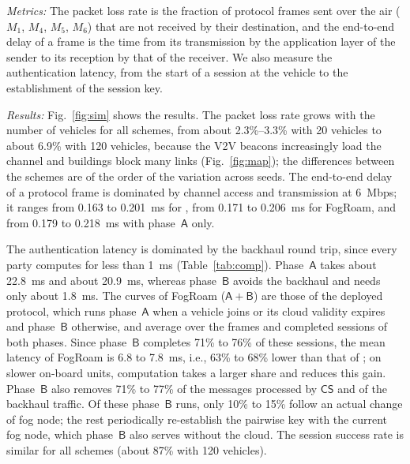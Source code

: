 \documentclass[journal]{IEEEtran}
\theoremstyle{plain}
\theoremstyle{definition}
\newcommand{\CS}{\mathsf{CS}}            %
\newcommand{\protocol}{\textsf{FogRoam}}   %
\begin{document}
\emph{Metrics:} The packet loss rate is the fraction of protocol frames sent over the air ($M_1$, $M_4$, $M_5$, $M_6$) that are not received by their destination, and the end-to-end delay of a frame is the time from its transmission by the application layer of the sender to its reception by that of the receiver. We also measure the authentication latency, from the start of a session at the vehicle to the establishment of the session key.

\emph{Results:} Fig.~\ref{fig:sim} shows the results. The packet loss rate grows with the number of vehicles for all schemes, from about 2.3\%--3.3\% with 20 vehicles to about 6.9\% with 120 vehicles, because the V2V beacons increasingly load the channel and buildings block many links (Fig.~\ref{fig:map}); the differences between the schemes are of the order of the variation across seeds. The end-to-end delay of a protocol frame is dominated by channel access and transmission at 6~Mbps; it ranges from 0.163 to 0.201~ms for \cite{chen2024provably}, from 0.171 to 0.206~ms for {\protocol}, and from 0.179 to 0.218~ms with phase~$\mathsf{A}$ only.

The authentication latency is dominated by the backhaul round trip, since every party computes for less than 1~ms (Table~\ref{tab:comp}). Phase~$\mathsf{A}$ takes about 22.8~ms and \cite{chen2024provably} about 20.9~ms, whereas phase~$\mathsf{B}$ avoids the backhaul and needs only about 1.8~ms. The curves of {\protocol} ($\mathsf{A}{+}\mathsf{B}$) are those of the deployed protocol, which runs phase~$\mathsf{A}$ when a vehicle joins or its cloud validity expires and phase~$\mathsf{B}$ otherwise, and average over the frames and completed sessions of both phases. Since phase~$\mathsf{B}$ completes 71\% to 76\% of these sessions, the mean latency of {\protocol} is 6.8 to 7.8~ms, i.e., 63\% to 68\% lower than that of \cite{chen2024provably}; on slower on-board units, computation takes a larger share and reduces this gain. Phase~$\mathsf{B}$ also removes 71\% to 77\% of the messages processed by $\CS$ and of the backhaul traffic. Of these phase~$\mathsf{B}$ runs, only 10\% to 15\% follow an actual change of fog node; the rest periodically re-establish the pairwise key with the current fog node, which phase~$\mathsf{B}$ also serves without the cloud. The session success rate is similar for all schemes (about 87\% with 120 vehicles).
\end{document}
